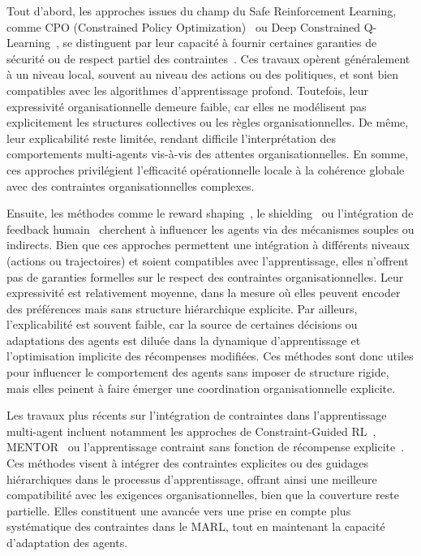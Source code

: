 Tout d'abord, les approches issues du champ du Safe Reinforcement Learning, comme CPO (Constrained Policy Optimization)~\cite{achiam2017constrained} ou Deep Constrained Q-Learning~\cite{kalweit2020deep}, se distinguent par leur capacité à fournir certaines garanties de sécurité ou de respect partiel des contraintes~\cite{garcia2015comprehensive}. Ces travaux opèrent généralement à un niveau local, souvent au niveau des actions ou des politiques, et sont bien compatibles avec les algorithmes d’apprentissage profond. Toutefois, leur expressivité organisationnelle demeure faible, car elles ne modélisent pas explicitement les structures collectives ou les règles organisationnelles. De même, leur explicabilité reste limitée, rendant difficile l'interprétation des comportements multi-agents vis-à-vis des attentes organisationnelles. En somme, ces approches privilégient l'efficacité opérationnelle locale à la cohérence globale avec des contraintes organisationnelles complexes.

Ensuite, les méthodes comme le reward shaping~\cite{ng1999policy}, le shielding~\cite{amodei2016concrete} ou l’intégration de feedback humain~\cite{warnell2018deep, zhou2025mentor} cherchent à influencer les agents via des mécanismes souples ou indirects. Bien que ces approches permettent une intégration à différents niveaux (actions ou trajectoires) et soient compatibles avec l’apprentissage, elles n’offrent pas de garanties formelles sur le respect des contraintes organisationnelles. Leur expressivité est relativement moyenne, dans la mesure où elles peuvent encoder des préférences mais sans structure hiérarchique explicite. Par ailleurs, l’explicabilité est souvent faible, car la source de certaines décisions ou adaptations des agents est diluée dans la dynamique d’apprentissage et l’optimisation implicite des récompenses modifiées. Ces méthodes sont donc utiles pour influencer le comportement des agents sans imposer de structure rigide, mais elles peinent à faire émerger une coordination organisationnelle explicite.

Les travaux plus récents sur l’intégration de contraintes dans l’apprentissage multi-agent incluent notamment les approches de Constraint-Guided RL~\cite{spieker2021constraint}, MENTOR~\cite{zhou2025mentor} ou l’apprentissage contraint sans fonction de récompense explicite~\cite{miryoosefi2022}. Ces méthodes visent à intégrer des contraintes explicites ou des guidages hiérarchiques dans le processus d’apprentissage, offrant ainsi une meilleure compatibilité avec les exigences organisationnelles, bien que la couverture reste partielle. Elles constituent une avancée vers une prise en compte plus systématique des contraintes dans le MARL, tout en maintenant la capacité d’adaptation des agents.


